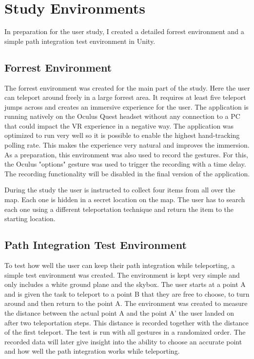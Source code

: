 
\chapter{Study Environments}
In preparation for the user study, I created a detailed forrest environment and a simple path integration test environment in Unity.



\section{Forrest Environment}

The forrest environment was created for the main part of the study. Here the user can teleport around freely in a large forrest area. It requires at least five teleport jumps across and creates an immersive experience for the user. The application is running natively on the Oculus Quest headset without any connection to a PC that could impact the VR experience in a negative way. The application was optimized to run very well so it is possible to enable the highest hand-tracking polling rate. This makes the experience very natural and improves the immersion. As a preparation, this environment was also used to record the gestures. For this, the Oculus "options" gesture was used to trigger the recording with a time delay. The recording functionality will be disabled in the final version of the application. %

During the study the user is instructed to collect four items from all over the map. Each one is hidden in a secret location on the map. The user has to search each one using a different teleportation technique and return the item to the starting location. 


\section{Path Integration Test Environment} %
To test how well the user can keep their path integration while teleporting, a simple test environment was created. The environment is kept very simple and only includes a white ground plane and the skybox. The user starts at a point A and is given the task to teleport to a point B that they are free to choose, to turn around and then return to the point A. The environment was created to measure the distance between the actual point A and the point A' the user landed on after two teleportation steps. This distance is recorded together with the distance of the first teleport. The test is run with all gestures in a randomized order. The recorded data will later give insight into the ability to choose an accurate point and how well the path integration works while teleporting.
